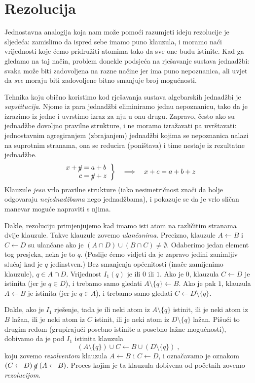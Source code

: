 \section{Rezolucija}

Jednostavna analogija koja nam može pomoći razumjeti ideju rezolucije je sljedeća: zamislimo da ispred sebe imamo puno klauzula, i moramo naći vrijednosti koje ćemo pridružiti atomima tako da sve one budu istinite. Kad ga gledamo na taj način, problem donekle podsjeća na rješavanje sustava jednadžbi: svaka može biti zadovoljena na razne načine jer ima puno nepoznanica, ali uvjet da \emph{sve} moraju biti zadovoljene bitno smanjuje broj mogućnosti.

Tehnika koju obično koristimo kod rješavanja sustava algebarskih jednadžbi je \emph{supstitucija}. Njome iz para jednadžbi eliminiramo jednu nepoznanicu, tako da je izrazimo iz jedne i uvrstimo izraz za nju u onu drugu. Zapravo, često ako su jednadžbe dovoljno pravilne strukture, i ne moramo izražavati pa uvrštavati: jednostavnim agregiranjem (zbrajanjem) jednadžbi kojima se nepoznanica nalazi na suprotnim stranama, ona se reducira (po\-ni\-šta\-va) i time nestaje iz rezultatne jednadžbe.
$$\left.\begin{array}{r@{\;=\;}l}x+\cancel{y}&a+b\\c&\cancel{y}+z\end{array}\right\}\quad\Longrightarrow\quad x + c = a + b + z$$
Klauzule \emph{jesu} vrlo pravilne strukture (iako nesimetričnost znači da bolje odgovaraju \emph{nejednadžbama} nego jednadžbama), i pokazuje se da je vrlo sličan manevar moguće napraviti s njima. 

Dakle, rezoluciju primjenjujemo kad imamo isti atom na različitim stranama dvije klauzule. Takve klauzule zovemo \emph{ulančanima}. Precizno, klauzule $A\leftarrow B$ i $C\leftarrow D$ su ulančane ako je $(A\cap D)\cup(B\cap C)\not=\emptyset$. Odaberimo jedan element tog presjeka, neka je to $q$. (Poslije ćemo vidjeti da je zapravo jedini zanimljiv slučaj kad je $q$ jedinstven.) Bez smanjenja općenitosti (inače zamijenimo klauzule), $q\in A\cap D$. Vrijednost $I_1(q)$ je ili $0$ ili $1$. Ako je $0$, klauzula $C\leftarrow D$ je istinita (jer je $q\in D$), i trebamo samo gledati $A\setminus\{q\}\leftarrow B$. Ako je pak $1$, klauzula $A\leftarrow B$ je istinita (jer je $q\in A$), i trebamo samo gledati $C\leftarrow D\setminus\{q\}$.

Dakle, ako je $I_1$ rješenje, tada je ili neki atom iz $A\setminus\{q\}$ istinit, ili je neki atom iz $B$ lažan, ili je neki atom iz $C$ istinit, ili je neki atom iz $D\setminus\{q\}$ lažan. Pišući to drugim redom (grupirajući posebno istinite a posebno lažne mogućnosti), dobivamo da je pod $I_1$ istinita klauzula $$(A\setminus\{q\})\cup C\leftarrow B\cup(D\setminus\{q\})\;,$$
koju zovemo \emph{rezolventom} klauzula $A\leftarrow B$ i $C\leftarrow D$, i označavamo je oznakom $(C\leftarrow D)\;\cancel{q}\;(A\leftarrow B)$. Proces kojim je ta klauzula dobivena od početnih zovemo \emph{rezolucijom}.

